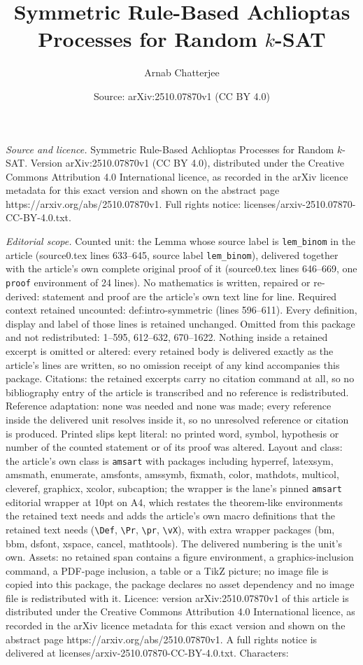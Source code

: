 \documentclass[10pt,a4paper]{amsart}
\title[Symmetric Rule-Based Achlioptas Processes for Random $k$-SAT]{Symmetric Rule-Based Achlioptas Processes for Random $k$-SAT}
\author{Arnab Chatterjee}
\date{Source: arXiv:2510.07870v1 (CC BY 4.0)}
\begin{document}
\maketitle

\noindent\emph{Source and licence.} Symmetric Rule-Based Achlioptas Processes for Random $k$-SAT. Version arXiv:2510.07870v1 (CC BY 4.0), distributed under the Creative Commons Attribution 4.0 International licence, as recorded in the arXiv licence metadata for this exact version and shown on the abstract page https://arxiv.org/abs/2510.07870v1. Full rights notice: licenses/arxiv-2510.07870-CC-BY-4.0.txt.\par\smallskip

\noindent\textit{Editorial scope.} Counted unit: the Lemma whose source label is \texttt{lem\_binom} in the article (source0.tex lines 633--645, source label \texttt{lem\_binom}), delivered together with the article's own complete original proof of it (source0.tex lines 646--669, one \texttt{proof} environment of 24 lines). No mathematics is written, repaired or re-derived: statement and proof are the article's own text line for line. Required context retained uncounted: def:intro-symmetric (lines 596--611). Every definition, display and label of those lines is retained unchanged. Omitted from this package and not redistributed: 1--595, 612--632, 670--1622. Nothing inside a retained excerpt is omitted or altered: every retained body is delivered exactly as the article's lines are written, so no omission receipt of any kind accompanies this package. Citations: the retained excerpts carry no citation command at all, so no bibliography entry of the article is transcribed and no reference is redistributed. Reference adaptation: none was needed and none was made; every reference inside the delivered unit resolves inside it, so no unresolved reference or citation is produced. Printed slips kept literal: no printed word, symbol, hypothesis or number of the counted statement or of its proof was altered. Layout and class: the article's own class is \texttt{amsart} with packages including hyperref, latexsym, amsmath, enumerate, amsfonts, amssymb, fixmath, color, mathdots, multicol, cleveref, graphicx, xcolor, subcaption; the wrapper is the lane's pinned \texttt{amsart} editorial wrapper at 10pt on A4, which restates the theorem-like environments the retained text needs and adds the article's own macro definitions that the retained text needs (\texttt{\textbackslash Def}, \texttt{\textbackslash Pr}, \texttt{\textbackslash pr}, \texttt{\textbackslash vX}), with extra wrapper packages (bm, bbm, dsfont, xspace, cancel, mathtools). The delivered numbering is the unit's own. Assets: no retained span contains a figure environment, a graphics-inclusion command, a PDF-page inclusion, a table or a TikZ picture; no image file is copied into this package, the package declares no asset dependency and no image file is redistributed with it. Licence: version arXiv:2510.07870v1 of this article is distributed under the Creative Commons Attribution 4.0 International licence, as recorded in the arXiv licence metadata for this exact version and shown on the abstract page https://arxiv.org/abs/2510.07870v1. A full rights notice is delivered at licenses/arxiv-2510.07870-CC-BY-4.0.txt. Characters: 
\end{document}
